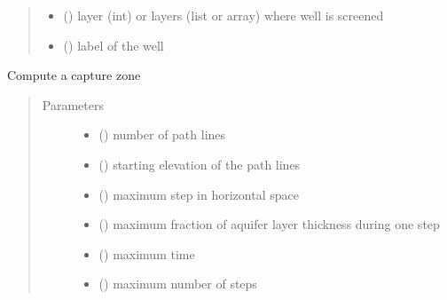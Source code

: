 \documentclass[letterpaper,10pt,english]{sphinxmanual}
\begin{document}
\begin{fulllineitems}
\begin{quote}
\begin{description}
\begin{itemize}
\item {} 
 (\sphinxstyleliteralemphasis{, }) \textendash{} layer (int) or layers (list or array) where well is screened

\item {} 
 (\sphinxstyleliteralemphasis{ (}\sphinxstyleliteralemphasis{)}) \textendash{} label of the well

\end{itemize}

\end{description}\end{quote}

\begin{fulllineitems}
\label{\detokenize{wells/headwell:timml.well.HeadWell.capzone}}
Compute a capture zone
\begin{quote}\begin{description}
\item[{Parameters}] \leavevmode\begin{itemize}
\item {} 
 () \textendash{} number of path lines

\item {} 
 () \textendash{} starting elevation of the path lines

\item {} 
 () \textendash{} maximum step in horizontal space

\item {} 
 () \textendash{} maximum fraction of aquifer layer thickness during one step

\item {} 
 () \textendash{} maximum time

\item {} 
 (\sphinxstyleliteralemphasis{(}\sphinxstyleliteralemphasis{)}) \textendash{} maximum number of steps


\end{itemize}
\end{description}
\end{quote}
\end{fulllineitems}
\end{fulllineitems}
\end{document}
